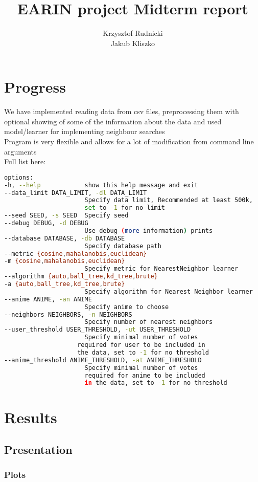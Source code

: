 \documentclass[12pt]{article}
\title{EARIN project Midterm report}
\author{Krzysztof Rudnicki \\ Jakub Kliszko}
\begin{document}
\maketitle
\section{Progress}
We have implemented reading data from csv files, preprocessing them with optional showing of some of the information about the data and used model/learner for implementing neighbour searches \\ 
Program is very flexible and allows for a lot of modification from command line arguments \\
Full list here:
\begin{lstlisting}[language=bash]
options:
-h, --help            show this help message and exit
--data_limit DATA_LIMIT, -dl DATA_LIMIT
                      Specify data limit, Recommended at least 500k,
                      set to -1 for no limit
--seed SEED, -s SEED  Specify seed
--debug DEBUG, -d DEBUG
                      Use debug (more information) prints
--database DATABASE, -db DATABASE
                      Specify database path
--metric {cosine,mahalanobis,euclidean}
-m {cosine,mahalanobis,euclidean}
                      Specify metric for NearestNeighbor learner
--algorithm {auto,ball_tree,kd_tree,brute}
-a {auto,ball_tree,kd_tree,brute}
                      Specify algorithm for Nearest Neighbor learner
--anime ANIME, -an ANIME
                      Specify anime to choose
--neighbors NEIGHBORS, -n NEIGHBORS
                      Specify number of nearest neighbors
--user_threshold USER_THRESHOLD, -ut USER_THRESHOLD
                      Specify minimal number of votes
                    required for user to be included in
                    the data, set to -1 for no threshold
--anime_threshold ANIME_THRESHOLD, -at ANIME_THRESHOLD
                      Specify minimal number of votes
                      required for anime to be included
                      in the data, set to -1 for no threshold
\end{lstlisting}
\section{Results}
\subsection{Presentation}
\subsubsection{Plots}
\end{document}

